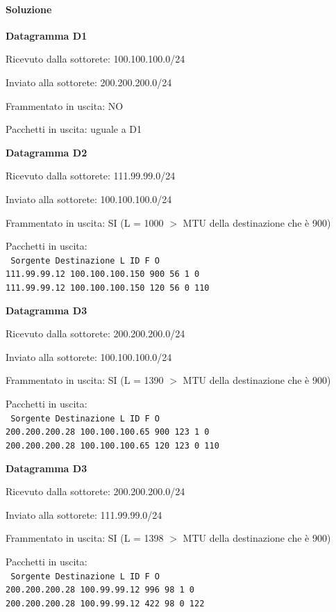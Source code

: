 \documentclass[10pt]{article}
\begin{document}
\paragraph{Soluzione}
\begin{list}{}{}
\item \textbf{Datagramma D1}
	\begin{list}{-}{}
	\item Ricevuto dalla sottorete: 100.100.100.0/24
	\item Inviato alla sottorete: 200.200.200.0/24
	\item Frammentato in uscita: NO
	\item Pacchetti in uscita: uguale a D1
	\end{list}
\item \textbf{Datagramma D2}
	\begin{list}{-}{}
	\item Ricevuto dalla sottorete: 111.99.99.0/24
	\item Inviato alla sottorete: 100.100.100.0/24
	\item Frammentato in uscita: SI (L = 1000 $>$ MTU della destinazione che è 900)
	\item Pacchetti in uscita:\\
		\texttt{  Sorgente      Destinazione      L    ID    F    O}\\
		\texttt{111.99.99.12   100.100.100.150   900   56    1    0}\\
		\texttt{111.99.99.12   100.100.100.150   120   56    0  110}
	\end{list}
\item \textbf{Datagramma D3}
	\begin{list}{-}{}
	\item Ricevuto dalla sottorete: 200.200.200.0/24
	\item Inviato alla sottorete: 100.100.100.0/24
	\item Frammentato in uscita: SI (L = 1390 $>$ MTU della destinazione che è 900)
	\item Pacchetti in uscita:\\
		\texttt{  Sorgente      Destinazione      L    ID    F    O}\\
		\texttt{200.200.200.28   100.100.100.65   900   123    1    0}\\
		\texttt{200.200.200.28   100.100.100.65   120   123    0  110}
	\end{list}
\item \textbf{Datagramma D3}
	\begin{list}{-}{}
	\item Ricevuto dalla sottorete: 200.200.200.0/24
	\item Inviato alla sottorete: 111.99.99.0/24
	\item Frammentato in uscita: SI (L = 1398 $>$ MTU della destinazione che è 900)
	\item Pacchetti in uscita:\\
		\texttt{  Sorgente      Destinazione      L    ID    F    O}\\
		\texttt{200.200.200.28   100.99.99.12   996   98    1    0}\\
		\texttt{200.200.200.28   100.99.99.12   422   98    0  122}
	\end{list}
\end{list} 
\end{document}
